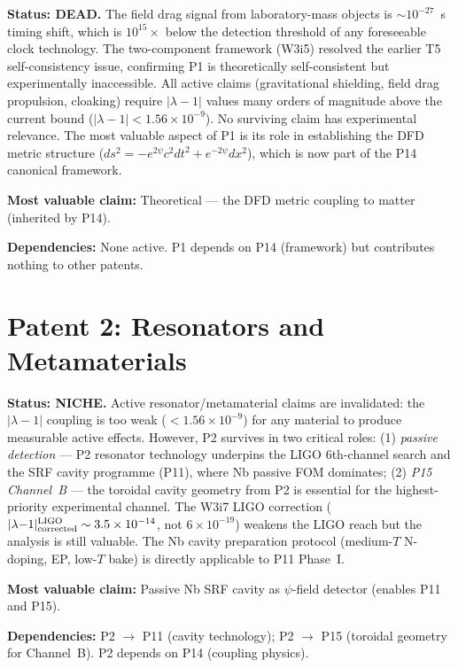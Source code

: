 \documentclass[11pt]{article}
\newcommand{\ee}[1]{\times 10^{#1}}
\newcommand{\lambdaone}{|\lambda{-}1|}
\begin{document}
\begin{tcolorbox}[colback=red!5!white, colframe=red!60!black,
  title=\textbf{P1: DEAD --- Resource Allocation: 0/5}]
\textbf{Status: DEAD.}
The field drag signal from laboratory-mass objects is $\sim 10^{-27}$~s
timing shift, which is $10^{15}\times$ below the detection threshold of any
foreseeable clock technology. The two-component framework (W3i5) resolved
the earlier T5 self-consistency issue, confirming P1 is theoretically
self-consistent but experimentally inaccessible. All active claims
(gravitational shielding, field drag propulsion, cloaking) require
$\lambdaone$ values many orders of magnitude above the current bound
($\lambdaone < 1.56\ee{-9}$). No surviving claim has experimental
relevance. The most valuable aspect of P1 is its role in establishing
the DFD metric structure ($ds^2 = -e^{2\psi}c^2dt^2 + e^{-2\psi}dx^2$),
which is now part of the P14 canonical framework.

\textbf{Most valuable claim:} Theoretical --- the DFD metric coupling
to matter (inherited by P14).

\textbf{Dependencies:} None active. P1 depends on P14 (framework) but
contributes nothing to other patents.
\end{tcolorbox}

\section{Patent 2: Resonators and Metamaterials}
\label{sec:P2}

\begin{tcolorbox}[colback=yellow!5!white, colframe=yellow!60!black,
  title=\textbf{P2: NICHE --- Resource Allocation: 2/5}]
\textbf{Status: NICHE.}
Active resonator/metamaterial claims are invalidated: the $\lambdaone$
coupling is too weak ($< 1.56\ee{-9}$) for any material to produce
measurable active effects. However, P2 survives in two critical roles:
(1) \emph{passive detection} --- P2 resonator technology underpins the
LIGO 6th-channel search and the SRF cavity programme (P11), where Nb
passive FOM dominates; (2) \emph{P15 Channel~B} --- the toroidal cavity
geometry from P2 is essential for the highest-priority experimental
channel. The W3i7 LIGO correction ($\lambdaone^{\rm LIGO}_{\rm corrected}
\sim 3.5\ee{-14}$, not $6\ee{-19}$) weakens the LIGO reach but the
analysis is still valuable. The Nb cavity preparation protocol
(medium-$T$ N-doping, EP, low-$T$ bake) is directly applicable to P11
Phase~I.

\textbf{Most valuable claim:} Passive Nb SRF cavity as $\psi$-field
detector (enables P11 and P15).

\textbf{Dependencies:} P2 $\to$ P11 (cavity technology); P2 $\to$ P15
(toroidal geometry for Channel~B). P2 depends on P14 (coupling physics).
\end{tcolorbox}
\end{document}
